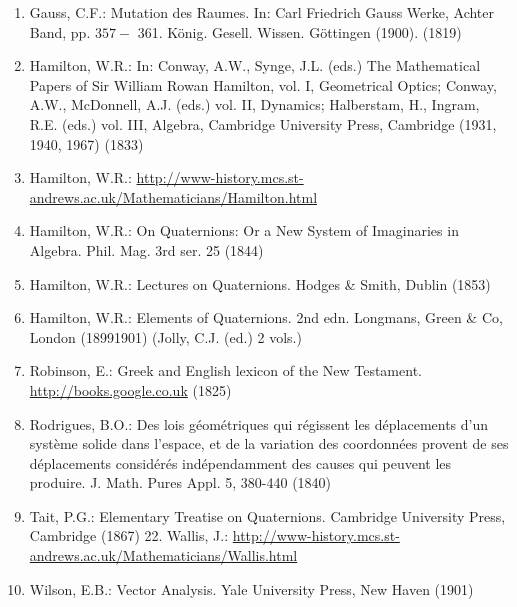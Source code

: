 \begin{enumerate}
  \item Gauss, C.F.: Mutation des Raumes. In: Carl Friedrich Gauss Werke, Achter Band, pp. $357-$ 361. König. Gesell. Wissen. Göttingen (1900). (1819)

  \item Hamilton, W.R.: In: Conway, A.W., Synge, J.L. (eds.) The Mathematical Papers of Sir William Rowan Hamilton, vol. I, Geometrical Optics; Conway, A.W., McDonnell, A.J. (eds.) vol. II, Dynamics; Halberstam, H., Ingram, R.E. (eds.) vol. III, Algebra, Cambridge University Press, Cambridge (1931, 1940, 1967) (1833)

  \item Hamilton, W.R.: \href{http://www-history.mcs.st-andrews.ac.uk/Mathematicians/Hamilton.html}{http://www-history.mcs.st-andrews.ac.uk/Mathematicians/Hamilton.html}

  \item Hamilton, W.R.: On Quaternions: Or a New System of Imaginaries in Algebra. Phil. Mag. 3rd ser. 25 (1844)

  \item Hamilton, W.R.: Lectures on Quaternions. Hodges \& Smith, Dublin (1853)

  \item Hamilton, W.R.: Elements of Quaternions. 2nd edn. Longmans, Green \& Co, London (18991901) (Jolly, C.J. (ed.) 2 vols.)

  \item Robinson, E.: Greek and English lexicon of the New Testament. \href{http://books.google.co.uk}{http://books.google.co.uk} (1825)

  \item Rodrigues, B.O.: Des lois géométriques qui régissent les déplacements d'un système solide dans l'espace, et de la variation des coordonnées provent de ses déplacements considérés indépendamment des causes qui peuvent les produire. J. Math. Pures Appl. 5, 380-440 (1840)

  \item Tait, P.G.: Elementary Treatise on Quaternions. Cambridge University Press, Cambridge (1867) 22. Wallis, J.: \href{http://www-history.mcs.st-andrews.ac.uk/Mathematicians/Wallis.html}{http://www-history.mcs.st-andrews.ac.uk/Mathematicians/Wallis.html}

  \item Wilson, E.B.: Vector Analysis. Yale University Press, New Haven (1901)

\end{enumerate}


